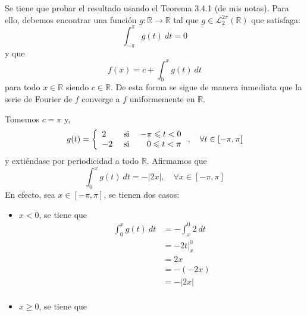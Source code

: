 \documentclass[12pt]{report}
\newcounter{it}
\theoremstyle{largebreak}
\renewcommand{\leq}{\ensuremath{\leqslant}}
\renewcommand{\geq}{\ensuremath{\geqslant}}
\newcommand\abs[1]{\ensuremath{\left|#1\right|}}
\newcommand\cf[3]{\ensuremath{#1:#2\rightarrow#3}}
\begin{document}
    \begin{sol}
        Se tiene que probar el resultado usando el Teorema 3.4.1 (de mis notas). Para ello, debemos encontrar una función $\cf{g}{\mathbb{R}}{\mathbb{R}}$ tal que $g\in\mathcal{L}_2^{2\pi}(\mathbb{R})$ que satisfaga:
        \begin{equation*}
            \int_{-\pi}^{\pi}g(t)\:dt=0
        \end{equation*}
        y que
        \begin{equation*}
            f(x)=c+\int_{0}^{x}g(t)\:dt
        \end{equation*}
        para todo $x\in\mathbb{R}$ siendo $c\in\mathbb{R}$. De esta forma se sigue de manera inmediata que la serie de Fourier de $f$ converge a $f$ uniformemente en $\mathbb{R}$.

        Tomemos $c=\pi$ y,
        \begin{equation*}
            g(t)=\left\{
                \begin{array}{lcr}
                     2 & \textup{ si } & -\pi\leq t<0\\
                     -2 & \textup{ si } & 0\leq t<\pi\\
                \end{array}
            \right.,\quad\forall t\in[-\pi,\pi[
        \end{equation*}
        y extiéndase por periodicidad a todo $\mathbb{R}$. Afirmamos que
        \begin{equation*}
            \int_{0}^{x}g(t)\:dt = -\abs{2x},\quad\forall x\in[-\pi,\pi]
        \end{equation*}
        En efecto, sea $x\in[-\pi,\pi]$, se tienen dos casos:
        \begin{itemize}
            \item $x<0$, se tiene que 
            \begin{equation*}
                \begin{split}
                    \int_{0}^{x}g(t)\:dt&=-\int_{x}^{0}2\:dt\\
                    &=-2 t\Big|_{x}^0\\
                    &=2x\\
                    &=-(-2x)\\
                    &=-\abs{2x}\\
                \end{split}
            \end{equation*}
            \item $x\geq 0$, se tiene que

\end{itemize}
\end{sol}
\end{document}
